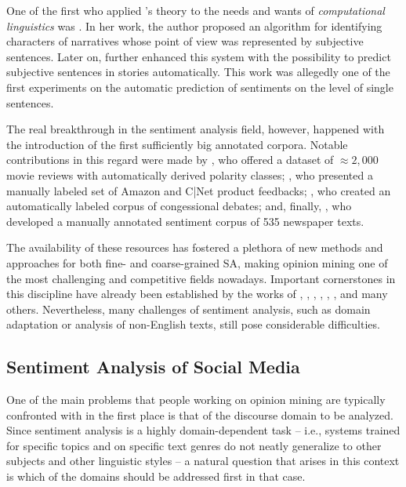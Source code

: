 One of the first who applied \citeauthor{Banfield:82}'s theory to the
needs and wants of \emph{computational linguistics} was
\citet{Wiebe:90a}.  In her work, the author proposed an algorithm for
identifying characters of narratives whose point of view was
represented by subjective sentences.  Later on, \citet{Wiebe:94}
further enhanced this system with the possibility to predict
subjective sentences in stories automatically.  This work was
allegedly one of the first experiments on the automatic prediction of
sentiments on the level of single sentences.

The real breakthrough in the sentiment analysis field, however,
happened with the introduction of the first sufficiently big annotated
corpora.  Notable contributions in this regard were made by
\citet{Pang:04,Pang:05}, who offered a dataset of $\approx2,000$ movie
reviews with automatically derived polarity classes; \citet{Hu:04},
who presented a manually labeled set of Amazon and C|Net product
feedbacks; \citet{Thomas:06}, who created an automatically labeled
corpus of congessional debates; and, finally, \citet{Wiebe:05}, who
developed a manually annotated sentiment corpus of 535 newspaper
texts.

The availability of these resources has fostered a plethora of new
methods and approaches for both fine- and coarse-grained SA, making
opinion mining one of the most challenging and competitive fields
nowadays.  Important cornerstones in this discipline have already been
established by the works of \citet{Pang:02}, \citet{Wiebe:05},
\citet{Wilson:05}, \citet{Breck:07}, \citet{Choi:09,Choi:10},
\citet{Yessenalina:11}, \citet{Socher:11, Socher:12} and many others.
Nevertheless, many challenges of sentiment analysis, such as domain
adaptation or analysis of non-English texts, still pose considerable
difficulties.

\subsection{Sentiment Analysis of Social Media}

One of the main problems that people working on opinion mining are
typically confronted with in the first place is that of the discourse
domain to be analyzed.  Since sentiment analysis is a highly
domain-dependent task \citep[cf.][]{Aue:05,Blitzer:07,Li:08} -- i.e.,
systems trained for specific topics and on specific text genres do not
neatly generalize to other subjects and other linguistic styles -- a
natural question that arises in this context is which of the domains
should be addressed first in that case.


